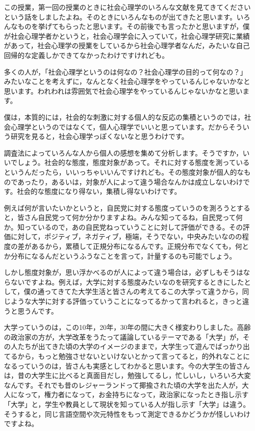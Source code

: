 \documentclass{ltjsbook}
\begin{document}
この授業，第一回の授業のときに社会心理学のいろんな文献を見てきてくださいという話をしましたよね。そのときにいろんなものが出てきたと思います。いろんなものを挙げてもらったと思います。その前後でも言ったかと思いますが，僕が社会心理学者かというと，社会心理学会に入っていて，社会心理学研究に業績があって，社会心理学の授業をしているから社会心理学者なんだ，みたいな自己回帰的な定義しかできてなかったわけですけれども。

多くの人が，「社会心理学というのは何なの？社会心理学の目的って何なの？」みたいなことを考えずに，なんとなく社会心理学をやっているんじゃないかなと思います。われわれは雰囲気で社会心理学をやっているんじゃないかなと思います。

僕は，本質的には，社会的な刺激に対する個人的な反応の集積というのでは，社会心理学というのではなくて，個人心理学でいいと思っています。だからそういう研究を見ると，社会心理学っぽくないなと思うわけです。

調査法によっていろんな人から個人の感想を集めて分析します。そうですか，いいでしょう。社会的な態度，態度対象があって。それに対する態度を測っているというんだったら，いいっちゃいいんですけれども。その態度対象が個人的なものであったり，あるいは，対象が人によって違う場合なんかは成立しないわけです。社会的な態度になり得ない，集積し得ないわけです。

例えば何が言いたいかというと，自民党に対する態度っていうのを測ろうとすると，皆さん自民党って何か分かりますよね。みんな知ってるね，自民党って何か。知っているので，あの自民党ねっていうことに対して評価ができる。その評価に対して，ポジティブ，ネガティブ，極端，そうでない，中央みたいなのの程度の差があるから，累積して正規分布になるんです。正規分布でなくても，何とか分布になるんだというふうなことを言って，計量するのも可能でしょう。

しかし態度対象が，思い浮かべるのが人によって違う場合は，必ずしもそうはならないですよね。例えば，大学に対する態度みたいなのを研究するときにしたとして，僕の通ってきてた大学生活と皆さんの考えてるこの大学って違うから，同じような大学に対する評価っていうことになってるかって言われると，きっと違うと思うんです。

大学っていうのは，この10年，20年，30年の間に大きく様変わりしました。高齢の政治家の方が，大学改革をうたって議論しているテーマである「大学」が，その人たちが出てきた頃の大学のイメージのままで，大学生って遊んでばっかり出てるから，もっと勉強させないといけないとかって言ってると，的外れなことになるっていうのは，皆さんも実感としてわかると思います。今の大学生の皆さんは，昔の大学生に比べると真面目だし，勉強してるし，忙しいし，いろいろ大変なんです。それでも昔のレジャーランドって揶揄された頃の大学を出た人が，大人になって，権力者になって，お金持ちになって，政治家になったとき指し示す「大学」と，学生や教員として現状を知っている人が指し示す「大学」は違う。そうすると，同じ言語空間や次元特性をもって測定できるかどうかが怪しいわけですよね。
\end{document}
